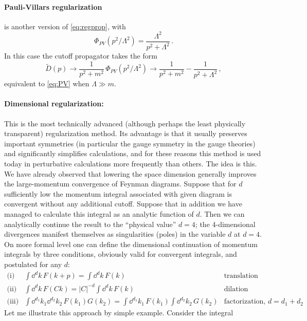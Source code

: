 \paragraph{Pauli-Villars regularization} is another version of
\eqref{eq:regprop}, with
\begin{equation}\label{eq:PV}
\Phi_{PV}(p^2/\Lambda^2)=\frac{\Lambda^2}{p^2+\Lambda^2}\,.
\end{equation}
In this case the cutoff propagator takes the form
\[
\tilde D(p)\to\frac1{p^2+m^2}\,\Phi_{PV}(p^2/\Lambda^2)\to\frac1{p^2+m^2}-\frac1{p^2+\Lambda^2}\,,
\]
equivalent to \eqref{eq:PV} when $\Lambda\gg m$.

\paragraph{Dimensional regularization:} This is the most technically advanced
(although perhaps the least physically transparent) regularization method. Its
advantage is that it usually preserves important symmetries (in particular the
gauge symmetry in the gauge theories) and significantly simplifies
calculations, and for these reasons this method is used today in perturbative
calculations more frequently than others. The idea is this. We have already
observed that lowering the space dimension generally improves the
large-momentum convergence of Feynman diagrams. Suppose that for $d$
sufficiently low the momentum integral associated with given diagram is
convergent without any additional cutoff. Suppose that in addition we have
managed to calculate this integral as an analytic function of $d$. Then we can
analytically continue the result to the ``physical value'' $d=4$; the
4-dimensional divergences manifest themselves as singularities (poles) in the
variable $d$ at $d=4$. On more formal level one can define the dimensional
continuation of momentum integrals by three conditions, obviously valid for
convergent integrals, and postulated for any $d$:
\[
\begin{array}{lll}
\text{(i)} & \displaystyle\int \dd^dk\,F(k+p)=\int \dd^dk\,F(k) & \text{translation}\\[10pt]
\text{(ii)} & \displaystyle\int \dd^dk\,F(Ck)=|C|^{-d}\int \dd^dk\,F(k) & \text{dilation}\\[10pt]
\text{(iii)} & \displaystyle\int \dd^{d_1}k_1\dd^{d_2}k_2\,F(k_1)G(k_2)=\int \dd^{d_1}k_1\,F(k_1)\int \dd^{d_2}k_2\,G(k_2) & \text{factorization, $d=d_1+d_2$}
\end{array}
\]
Let me illustrate this approach by simple example. Consider the integral
